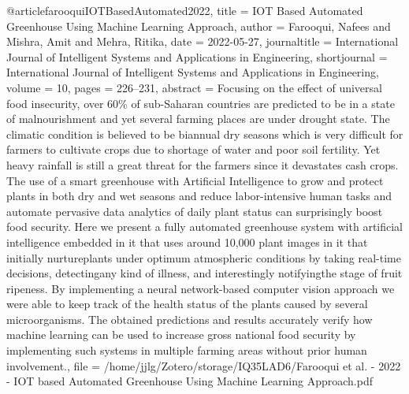 {{{@article{farooquiIOTBasedAutomated2022,
  title = {{{IOT}} Based {{Automated Greenhouse Using Machine Learning Approach}}},
  author = {Farooqui, Nafees and Mishra, Amit and Mehra, Ritika},
  date = {2022-05-27},
  journaltitle = {International Journal of Intelligent Systems and Applications in Engineering},
  shortjournal = {International Journal of Intelligent Systems and Applications in Engineering},
  volume = {10},
  pages = {226--231},
  abstract = {Focusing on the effect of universal food insecurity, over 60\% of sub-Saharan countries are predicted to be in a state of malnourishment and yet several farming places are under drought state. The climatic condition is believed to be biannual dry seasons which is very difficult for farmers to cultivate crops due to shortage of water and poor soil fertility. Yet heavy rainfall is still a great threat for the farmers since it devastates cash crops. The use of a smart greenhouse with Artificial Intelligence to grow and protect plants in both dry and wet seasons and reduce labor-intensive human tasks and automate pervasive data analytics of daily plant status can surprisingly boost food security. Here we present a fully automated greenhouse system with artificial intelligence embedded in it that uses around 10,000 plant images in it that initially nurtureplants under optimum atmospheric conditions by taking real-time decisions, detectingany kind of illness, and interestingly notifyingthe stage of fruit ripeness. By implementing a neural network-based computer vision approach we were able to keep track of the health status of the plants caused by several microorganisms. The obtained predictions and results accurately verify how machine learning can be used to increase gross national food security by implementing such systems in multiple farming areas without prior human involvement.},
  file = {/home/jjlg/Zotero/storage/IQ35LAD6/Farooqui et al. - 2022 - IOT based Automated Greenhouse Using Machine Learning Approach.pdf}
}

}}}
